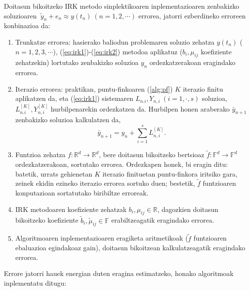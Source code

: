 Doitasun bikoitzeko IRK metodo sinplektikoaren inplementazioaren zenbakizko soluzioaren $\ \tilde{y}_n+e_n \approx y(t_n) \ (n=1,2,\cdots)$ errorea, jatorri ezberdineko erroreen konbinazioa da:
\begin{enumerate}
\item Trunkatze errorea: hasierako baliodun problemaren soluzio zehatza $y(t_n)$ ($n=1,2,3,\cdots$), (\ref{eq:irk1})-(\ref{eq:irk2}) metodoa aplikatuz  ($b_i,\mu_{ij}$ koefiziente zehatzekin) lortutako zenbakizko soluzioa $y_n$ ordezkatzerakoan eragindako errorea. 
\item Iterazio errorea: praktikan, puntu-finkoaren (\ref{alg:pf}) $K$ iterazio finitu aplikatzen da, eta (\ref{eq:irk1}) sistemaren $L_{n.i}, Y_{n,i} \ (i=1,\cdot,s)$ soluzioa, $L_{n.i}^{[K]}, Y_{n,i}^{[K]}$ hurbilpenarekin ordezkatzen da. Hurbilpen honen araberako $\bar{y}_{n+1}$ zenbakizko soluzioa kalkulatzen da,
\begin{equation*}
\bar{y}_{n+1}=y_{n}+\sum_{i=1}^{s} L_{n,i}^{[K]}.
\end{equation*}   
\item Funtzioa zehatza $f:\mathbb{R}^d \rightarrow \mathbb{R}^d$, bere doitasun bikoitzeko bertsioaz $\tilde{f}:\mathbb{F}^d \rightarrow \mathbb{F}^d$ ordezkatzerakoan, sortutako errorea.  Ordezkapen honek, bi eragin ditu: batetik, urrats gehienetan $K$ iterazio finituetan puntu-finkora iritsiko gara, zeinek  ekidin ezineko iterazio errorea sortuko duen; bestetik, $\tilde{f}$ funtzioaren konputazioan sortatutako biribiltze erroreak. 
\item IRK metodoaren koefiziente zehatzak $b_i,\mu_{ij} \in \mathbb{R}$, dagozkien doitasun bikoitzeko koefiziente $\tilde{b}_i,\tilde{\mu}_{ij} \in \mathbb{F}$ erabiltzeagatik eragindako errorea.
\item Algoritmoaren inplementazioaren eragiketa aritmetikoak ($\tilde{f}$ funtzioaren ebaluazioa egindakoaz gain), doitasun bikoitzean kalkulatzeagatik eragindako errorea.  
\end{enumerate} 

Errore jatorri hauek energian duten eragina estimatzeko, honako algoritmoak inplementatu ditugu:

